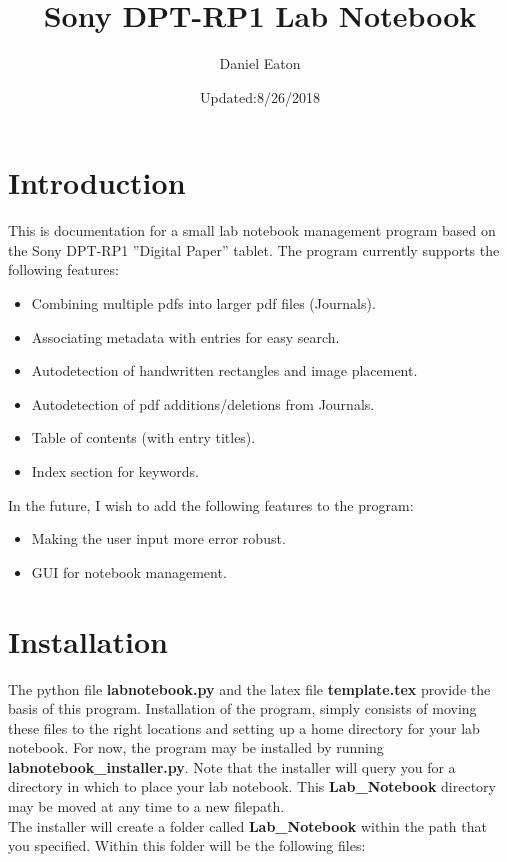 \documentclass{article}
\title{Sony DPT-RP1 Lab Notebook}
\author{Daniel Eaton}
\date{Updated:8/26/2018}
\begin{document}
\maketitle

\section{Introduction}

This is documentation for a small lab notebook management program based on the Sony DPT-RP1 ''Digital Paper'' tablet. The program currently supports the following features:
\begin{itemize}
    \item Combining multiple pdfs into larger pdf files (Journals).
    \item Associating metadata with entries for easy search.
    \item Autodetection of handwritten rectangles and image placement.
    \item Autodetection of pdf additions/deletions from Journals.
    \item Table of contents (with entry titles).
    \item Index section for keywords.
\end{itemize}

\noindent In the future, I wish to add the following features to the program:
\begin{itemize}
    \item Making the user input more error robust.
    \item GUI for notebook management.
\end{itemize}

\section{Installation}
The python file \textbf{labnotebook.py} and the latex file \textbf{template.tex} provide the basis of this program. Installation of the program, simply consists of moving these files to the right locations and setting up a home directory for your lab notebook. For now, the program may be installed by running \textbf{labnotebook\_installer.py}. Note that the installer will query you for a directory in which to place your lab notebook. This \textbf{Lab\_Notebook} directory may be moved at any time to a new filepath.\\

The installer will create a folder called \textbf{Lab\_Notebook} within the path that you specified. Within this folder will be the following files:\\
\end{document}
